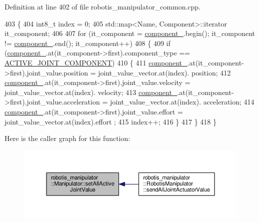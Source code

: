 Definition at line 402 of file robotis\+\_\+manipulator\+\_\+common.\+cpp.


\begin{DoxyCode}
403 \{
404   int8\_t index = 0;
405   std::map<Name, Component>::iterator it\_component;
406 
407   \textcolor{keywordflow}{for} (it\_component = \hyperlink{classrobotis__manipulator_1_1_manipulator_a20b388b821f161972c2cf737fe1c26db}{component\_}.begin(); it\_component != \hyperlink{classrobotis__manipulator_1_1_manipulator_a20b388b821f161972c2cf737fe1c26db}{component\_}.end(); 
      it\_component++)
408   \{
409     \textcolor{keywordflow}{if} (\hyperlink{classrobotis__manipulator_1_1_manipulator_a20b388b821f161972c2cf737fe1c26db}{component\_}.at(it\_component->first).component\_type == 
      \hyperlink{namespacerobotis__manipulator_a2bbf89d1c08dc1d9ff4e28beb939e382acdf3b34914d1a2a028d882beb96fba7c}{ACTIVE\_JOINT\_COMPONENT})
410     \{
411       \hyperlink{classrobotis__manipulator_1_1_manipulator_a20b388b821f161972c2cf737fe1c26db}{component\_}.at(it\_component->first).joint\_value.position = joint\_value\_vector.at(index).
      position;
412       \hyperlink{classrobotis__manipulator_1_1_manipulator_a20b388b821f161972c2cf737fe1c26db}{component\_}.at(it\_component->first).joint\_value.velocity = joint\_value\_vector.at(index).
      velocity;
413       \hyperlink{classrobotis__manipulator_1_1_manipulator_a20b388b821f161972c2cf737fe1c26db}{component\_}.at(it\_component->first).joint\_value.acceleration = joint\_value\_vector.at(index).
      acceleration;
414       \hyperlink{classrobotis__manipulator_1_1_manipulator_a20b388b821f161972c2cf737fe1c26db}{component\_}.at(it\_component->first).joint\_value.effort = joint\_value\_vector.at(index).effort
      ;
415       index++;
416     \}
417   \}
418 \}
\end{DoxyCode}


Here is the caller graph for this function\+:\nopagebreak
\begin{figure}[H]
\begin{center}
\leavevmode
\includegraphics[width=350pt]{classrobotis__manipulator_1_1_manipulator_af42c8e7d8b0a1fe505832d632348e804_icgraph}
\end{center}
\end{figure}


